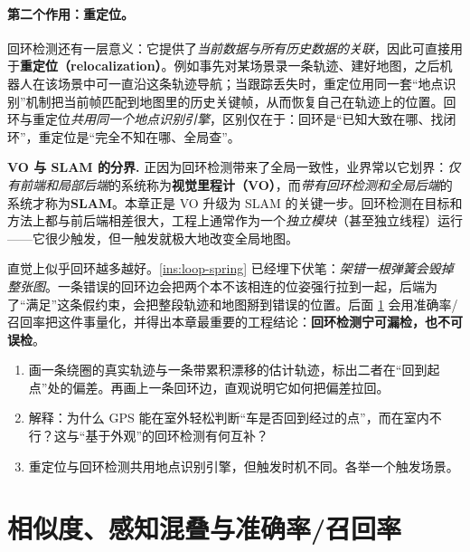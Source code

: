 \paragraph{第二个作用：重定位。}
回环检测还有一层意义\cite{gaoxiang2019slam14}：它提供了\emph{当前数据与所有历史数据的关联}，因此可直接用于\textbf{重定位（relocalization）}。例如事先对某场景录一条轨迹、建好地图，之后机器人在该场景中可一直沿这条轨迹导航；当跟踪丢失时，重定位用同一套“地点识别”机制把当前帧匹配到地图里的历史关键帧，从而恢复自己在轨迹上的位置。回环与重定位\emph{共用同一个地点识别引擎}，区别仅在于：回环是“已知大致在哪、找闭环”，重定位是“完全不知在哪、全局查”。

\begin{note}
\textbf{VO 与 SLAM 的分界.}\;
正因为回环检测带来了全局一致性，业界常以它划界\cite{gaoxiang2019slam14}：\emph{仅有前端和局部后端}的系统称为\textbf{视觉里程计（VO）}，而\emph{带有回环检测和全局后端}的系统才称为\textbf{SLAM}。本章正是 VO 升级为 SLAM 的关键一步。回环检测在目标和方法上都与前后端相差很大，工程上通常作为一个\emph{独立模块}（甚至独立线程）运行——它很少触发，但一触发就极大地改变全局地图。
\end{note}

\begin{pitfall}
直觉上似乎回环越多越好。\cref{ins:loop-spring} 已经埋下伏笔：\emph{架错一根弹簧会毁掉整张图}。一条错误的回环边会把两个本不该相连的位姿强行拉到一起，后端为了“满足”这条假约束，会把整段轨迹和地图掰到错误的位置。后面 \cref{sec:loop-pr} 会用准确率/召回率把这件事量化，并得出本章最重要的工程结论：\textbf{回环检测宁可漏检，也不可误检}。
\end{pitfall}

\begin{practice}
\begin{enumerate}
  \item 画一条绕圈的真实轨迹与一条带累积漂移的估计轨迹，标出二者在“回到起点”处的偏差。再画上一条回环边，直观说明它如何把偏差拉回。
  \item 解释：为什么 GPS 能在室外轻松判断“车是否回到经过的点”，而在室内不行？这与“基于外观”的回环检测有何互补？
  \item 重定位与回环检测共用地点识别引擎，但触发时机不同。各举一个触发场景。
\end{enumerate}
\end{practice}

\section{相似度、感知混叠与准确率/召回率}
\label{sec:loop-pr}

